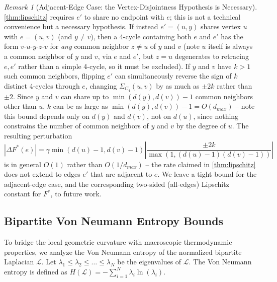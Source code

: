 \documentclass{siuro250211}
\theoremstyle{remark}
\newtheorem{remark}{Remark}
\theoremstyle{plain}
\begin{document}
\begin{remark}[Adjacent-Edge Case: the Vertex-Disjointness Hypothesis is Necessary]
\label{rem:lipschitz-adjacent}
\cref{thm:lipschitz} requires $e'$ to share no endpoint with $e$; this is not a technical convenience but a necessary hypothesis. If instead $e'=(u,y)$ shares vertex $u$ with $e=(u,v)$ (and $y \ne v$), then a 4-cycle containing both $e$ and $e'$ has the form $v\text{-}u\text{-}y\text{-}z\text{-}v$ for \emph{any} common neighbor $z \ne u$ of $y$ and $v$ (note $u$ itself is always a common neighbor of $y$ and $v$, via $e$ and $e'$, but $z=u$ degenerates to retracing $e,e'$ rather than a simple 4-cycle, so it must be excluded). If $y$ and $v$ have $k>1$ such common neighbors, flipping $e'$ can simultaneously reverse the sign of $k$ distinct 4-cycles through $e$, changing $\Sigma_{C_4}(u,v)$ by as much as $\pm 2k$ rather than $\pm 2$. Since $y$ and $v$ can share up to $\min(d(y),d(v)) - 1$ common neighbors other than $u$, $k$ can be as large as $\min(d(y),d(v)) - 1 = O(d_{max})$ -- note this bound depends only on $d(y)$ and $d(v)$, not on $d(u)$, since nothing constrains the number of common neighbors of $y$ and $v$ by the degree of $u$. The resulting perturbation
\begin{equation}
|\Delta F^*(e)| = \gamma \min(d(u)-1,d(v)-1)\left|\frac{\pm 2k}{\max(1,(d(u)-1)(d(v)-1))}\right|
\end{equation}
is in general $O(1)$ rather than $O(1/d_{max})$ -- the rate claimed in \cref{thm:lipschitz} does not extend to edges $e'$ that are adjacent to $e$. We leave a tight bound for the adjacent-edge case, and the corresponding two-sided (all-edges) Lipschitz constant for $F^*$, to future work.
\end{remark}

\subsection{Bipartite Von Neumann Entropy Bounds}
To bridge the local geometric curvature with macroscopic thermodynamic properties, we analyze the Von Neumann entropy of the normalized bipartite Laplacian $\mathcal{L}$. Let $\lambda_1 \le \lambda_2 \le \dots \le \lambda_N$ be the eigenvalues of $\mathcal{L}$. The Von Neumann entropy is defined as $H(\mathcal{L}) = - \sum_{i=1}^N \lambda_i \ln(\lambda_i)$.
\end{document}
